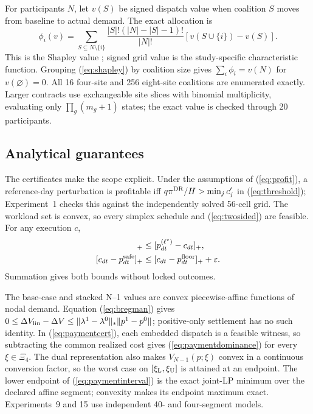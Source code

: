 \documentclass[10pt,journal]{IEEEtran}
\begin{document}
For participants $N$, let $v(S)$ be signed dispatch value when coalition $S$
moves from baseline to actual demand. The exact allocation is
\begin{equation}
 \phi_i(v)=\sum_{S\subseteq N\setminus\{i\}}
 \frac{|S|!(|N|-|S|-1)!}{|N|!}
 [v(S\cup\{i\})-v(S)].
 \label{eq:shapley}
\end{equation}
This is the Shapley value \cite{shapley1953value}; signed grid value is the
study-specific characteristic function. Grouping (\ref{eq:shapley}) by coalition
size gives $\sum_i\phi_i=v(N)$ for $v(\varnothing)=0$. All 16 four-site and 256
eight-site coalitions are enumerated exactly. Larger contracts use exchangeable
site slices with binomial multiplicity, evaluating only $\prod_g(m_g+1)$ states;
the exact value is checked through 20 participants.

\subsection{Analytical guarantees}

The certificates make the scope explicit. Under the assumptions of
(\ref{eq:profit}), a reference-day perturbation is profitable iff
$q\pi^{\rm DR}/H>\min_jc'_j$ in (\ref{eq:threshold}); Experiment~1 checks this
against the independently solved 56-cell grid. The workload set is convex, so
every simplex schedule and (\ref{eq:twosided}) are feasible. For any execution
$c$,
\begin{align*}
[p^{\rm safe}_{dt}-c_{dt}]_+&\leq[p^{(\ell^\star)}_{dt}-c_{dt}]_+,\\
[c_{dt}-p^{\rm safe}_{dt}]_+&\leq[c_{dt}-p^{\rm floor}_{dt}]_++\varepsilon .
\end{align*}
Summation gives both bounds without locked outcomes.

The base-case and stacked N--1 values are convex piecewise-affine functions of
nodal demand. Equation (\ref{eq:bregman}) gives
$0\leq\Delta V_{\rm lin}-\Delta V\leq
\lVert\lambda^1-\lambda^0\rVert_*\lVert p^1-p^0\rVert$; positive-only
settlement has no such identity. In (\ref{eq:paymentcert}), each embedded
dispatch is a feasible witness, so subtracting the common realized cost gives
(\ref{eq:paymentdominance}) for every $\xi\in\Xi_4$. The dual representation
also makes $V_{N-1}(p;\xi)$ convex in a continuous conversion factor, so the
worst case on $[\xi_{\rm L},\xi_{\rm U}]$ is attained at an endpoint. The
lower endpoint of (\ref{eq:paymentinterval}) is the exact joint-LP minimum
over the declared affine segment; convexity makes its endpoint maximum exact.
Experiments~9 and 15 use independent 40- and four-segment models.
\end{document}
